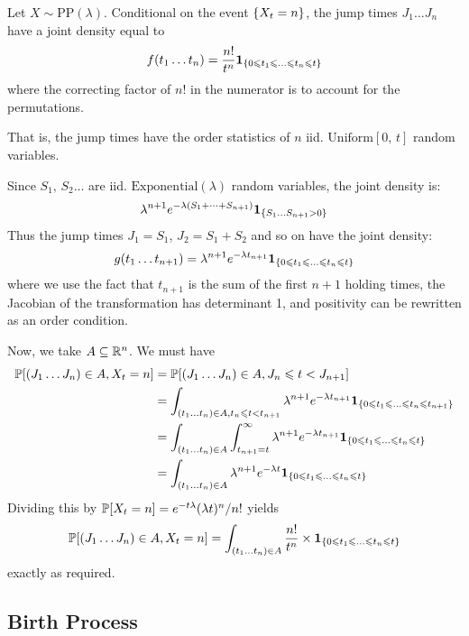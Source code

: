 \documentclass{article}
\begin{document}
\begin{theorem}
    Let $X \sim \mathrm{PP}(\lambda)$. Conditional on the event $\set{X_t = n}$, the jump times $J_1 \dots J_n$ have a joint density equal to
    \[
	f(t_1 \dots t_n) = \frac{n!}{t^n} \textbf{1}_{\set{0 \leq t_1 \leq \dots \leq t_n \leq t}}
	\]
	where the correcting factor of $n!$ in the numerator is to account for the permutations.
	
	That is, the jump times have the order statistics of $n$ iid. $\mathrm{Uniform}[0, \, t]$ random variables.
\end{theorem}
\begin{prf}
    Since $S_1, \, S_2 \dots$ are iid. $\mathrm{Exponential}(\lambda)$ random variables, the joint density is:
    \[
	\lambda^{n+1} e^{-\lambda(S_1 + \dots + S_{n+1})} \textbf{1}_{\set{S_1 \dots S_{n+1} > 0}}
	\]
	Thus the jump times $J_1 = S_1$, $J_2 = S_1 + S_2$ and so on have the joint density:
	\[
	g(t_1 \dots t_{n+1}) = \lambda^{n+1} e^{-\lambda t_{n+1}} \textbf{1}_{\set{0 \leq t_1 \leq \dots \leq t_n \leq t}}
	\]
	where we use the fact that $t_{n+1}$ is the sum of the first $n+1$ holding times, the Jacobian of the transformation has determinant 1, and positivity can be rewritten as an order condition.
	
	Now, we take $A \subs \R^n$. We must have
	\begin{align*}
    	\P[(J_1 \dots J_n) \in A, X_t = n] &= \P[(J_1 \dots J_n) \in A, J_n \leq t < J_{n+1}] \\
    	&= \int_{(t_1 \dots t_n) \in A, t_n \leq t < t_{n+1}} \lambda^{n+1} e^{-\lambda t_{n+1}} \textbf{1}_{\set{0 \leq t_1 \leq \dots \leq t_n \leq t_{n+1}}} \\
    	&= \int_{(t_1 \dots t_n) \in A} \int_{t_{n+1} = t}^\infty \lambda^{n+1} e^{-\lambda t_{n+1}} \textbf{1}_{\set{0 \leq t_1 \leq \dots \leq t_n \leq t}} \\
    	&= \int_{(t_1 \dots t_n) \in A} \lambda^{n+1} e^{-\lambda t} \textbf{1}_{\set{0 \leq t_1 \leq \dots \leq t_n \leq t}}
	\end{align*}
	Dividing this by $\P[X_t = n] = e^{-t\lambda} (\lambda t)^n / n!$ yields
	\[
	\P[(J_1 \dots J_n) \in A, X_t = n] = \int_{(t_1 \dots t_n) \in A} \frac{n!}{t^n} \times \textbf{1}_{\set{0 \leq t_1 \leq \dots \leq t_n \leq t}}
	\]
	exactly as required.
\end{prf}


\subsection{Birth Process}
\end{document}
